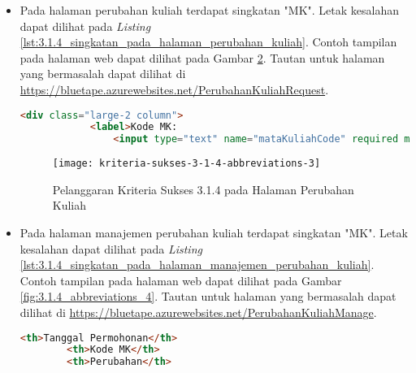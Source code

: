 \begin{itemize}
    \begin{figure}[H]
        \centering  
        \texttt{[image: kriteria-sukses-3-1-4-abbreviations-2]}  
        \caption[Pelanggaran Kriteria Sukses 3.1.4 pada Halaman Manajemen Cetak Transkrip]{Pelanggaran Kriteria Sukses 3.1.4 pada Halaman Manajemen Cetak Transkrip}
        \label{fig:3.1.4_abbreviations_2}  
    \end{figure}
    
    \item Pada halaman perubahan kuliah terdapat singkatan "MK". Letak kesalahan dapat dilihat pada \textit{Listing} \ref{lst:3.1.4_singkatan_pada_halaman_perubahan_kuliah}. Contoh tampilan pada halaman web dapat dilihat pada Gambar \ref{fig:3.1.4_abbreviations_3}. Tautan untuk halaman yang bermasalah dapat dilihat di \url{https://bluetape.azurewebsites.net/PerubahanKuliahRequest}.
    \begin{lstlisting}[frame=single, label={lst:3.1.4_singkatan_pada_halaman_perubahan_kuliah}, language=HTML, caption=Pelanggaran Kriteria Sukses 3.1.4 pada Halaman Perubahan Kuliah]
        <div class="large-2 column">
            <label>Kode MK:
                <input type="text" name="mataKuliahCode" required maxlength="9" pattern="[A-Z]{3}[0-9]{3}([0-9]{3})?" title="Kode MK dalam format XYZ123"/>
    \end{lstlisting}

    \begin{figure}[H]
        \centering  
        \texttt{[image: kriteria-sukses-3-1-4-abbreviations-3]}  
        \caption[Pelanggaran Kriteria Sukses 3.1.4 pada Halaman Perubahan Kuliah]{Pelanggaran Kriteria Sukses 3.1.4 pada Halaman Perubahan Kuliah}
        \label{fig:3.1.4_abbreviations_3}  
    \end{figure}
    
    \item Pada halaman manajemen perubahan kuliah terdapat singkatan "MK". Letak kesalahan dapat dilihat pada \textit{Listing} \ref{lst:3.1.4_singkatan_pada_halaman_manajemen_perubahan_kuliah}. Contoh tampilan pada halaman web dapat dilihat pada Gambar \ref{fig:3.1.4_abbreviations_4}. Tautan untuk halaman yang bermasalah dapat dilihat di \url{https://bluetape.azurewebsites.net/PerubahanKuliahManage}.
    \begin{lstlisting}[frame=single, label={lst:3.1.4_singkatan_pada_halaman_manajemen_perubahan_kuliah}, language=HTML, caption=Pelanggaran Kriteria Sukses 3.1.4 pada Halaman Manajemen Perubahan Kuliah]
        <th>Tanggal Permohonan</th>
        <th>Kode MK</th>
        <th>Perubahan</th>
    \end{lstlisting}


\end{itemize}
